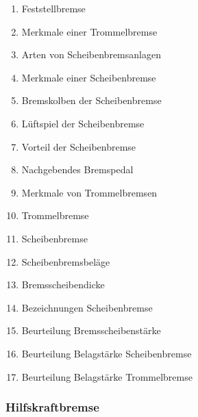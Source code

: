 \begin{enumerate}
\item
  Feststellbremse\\
\item
  Merkmale einer Trommelbremse\\
\item
  Arten von Scheibenbremsanlagen\\
\item
  Merkmale einer Scheibenbremse\\
\item
  Bremskolben der Scheibenbremse\\
\item
  Lüftspiel der Scheibenbremse\\
\item
  Vorteil der Scheibenbremse\\
\item
  Nachgebendes Bremspedal\\
\item
  Merkmale von Trommelbremsen\\
\item
  Trommelbremse\\
\item
  Scheibenbremse\\
\item
  Scheibenbremsbeläge\\
\item
  Bremsscheibendicke\\
\item
  Bezeichnungen Scheibenbremse\\
\item
  Beurteilung Bremsscheibenstärke\\
\item
  Beurteilung Belagstärke Scheibenbremse\\
\item
  Beurteilung Belagstärke Trommelbremse
\end{enumerate}

\subsubsection{Hilfskraftbremse}\label{hilfskraftbremse}

